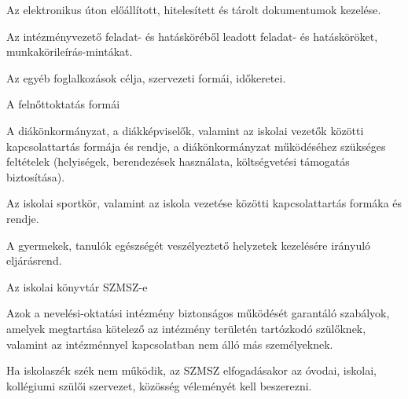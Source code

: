 Az elektronikus úton előállított, hitelesített és tárolt dokumentumok kezelése.

Az intézményvezető feladat- és hatásköréből leadott feladat- és hatásköröket, munkakörileírás-mintákat.


Az egyéb foglalkozások célja, szervezeti formái, időkeretei.

A felnőttoktatás formái

A diákönkormányzat, a diákképviselők, valamint az iskolai vezetők közötti kapcsolattartás formája és rendje, a diákönkormányzat működéséhez szükséges feltételek (helyiségek, berendezések használata, költségvetési támogatás biztosítása).

Az iskolai sportkör, valamint az iskola vezetése közötti kapcsolattartás formáka és rendje.



A gyermekek, tanulók egészségét veszélyeztető helyzetek kezelésére irányuló eljárásrend.

Az iskolai könyvtár SZMSZ-e

Azok a nevelési-oktatási intézmény biztonságos működését garantáló szabályok, amelyek megtartása kötelező az intézmény területén tartózkodó szülőknek, valamint az intézménnyel kapcsolatban nem álló más személyeknek.

Ha iskolaszék szék nem működik, az SZMSZ elfogadásakor az óvodai, iskolai, kollégiumi szülői szervezet, közösség véleményét kell beszerezni.

